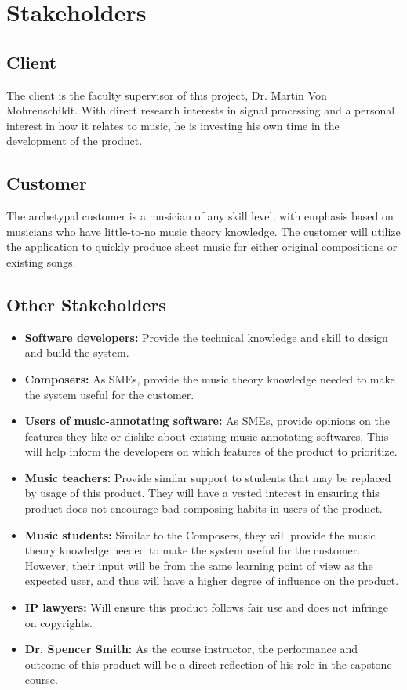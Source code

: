 \documentclass[12pt]{article}
\begin{document}
\section{Stakeholders}
\subsection{Client}
The client is the faculty supervisor of this project, Dr. Martin Von Mohrenschildt. With direct research interests in signal processing and a personal interest in how it relates to 
music, he is investing his own time in the development of the product.
\subsection{Customer}
The archetypal customer is a musician of any skill level, with emphasis based on musicians who have little-to-no music theory knowledge. The customer will utilize the application 
to quickly produce sheet music for either original compositions or existing songs. 
\subsection{Other Stakeholders}
\begin{itemize}
  \item \textbf{Software developers:} Provide the technical knowledge and skill to design and build the system.
  \item \textbf{Composers:} As SMEs, provide the music theory knowledge needed to make the system useful for the customer.
  \item \textbf{Users of music-annotating software:} As SMEs, provide opinions on the features they like or dislike about existing music-annotating softwares. This will help inform the developers on which features of the product to prioritize.
  \item \textbf{Music teachers:} Provide similar support to students that may be replaced by usage of this product. They will have a vested interest in ensuring this product does not encourage bad composing habits in users of the product.
  \item \textbf{Music students:} Similar to the Composers, they will provide the music theory knowledge needed to make the system useful for the customer. However, their input will be from the same learning point of view as the expected user, and thus will have a higher degree of influence on the product.
  \item \textbf{IP lawyers:} Will ensure this product follows fair use and does not infringe on copyrights.
  \item \textbf{Dr. Spencer Smith:} As the course instructor, the performance and outcome of this product will be a direct reflection of his role in the capstone course.
\end{itemize}
\end{document}
